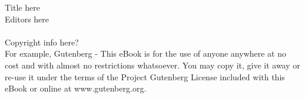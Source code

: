 \cleardoublepage
\thispagestyle{empty}
Title here\\
Editors here\\
\\
Copyright info here?\\
For example, Gutenberg - 
This eBook is for the use of anyone anywhere at no cost and with almost no restrictions whatsoever. You may copy it, give it away or re-use it under the terms of the Project Gutenberg License included with this eBook or online at www.gutenberg.org.


